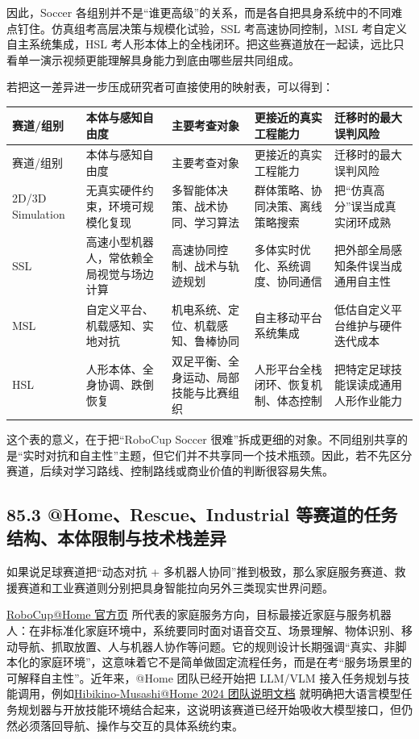 因此，Soccer 各组别并不是“谁更高级”的关系，而是各自把具身系统中的不同难点钉住。仿真组考高层决策与规模化试验，SSL 考高速协同控制，MSL 考自定义自主系统集成，HSL 考人形本体上的全栈闭环。把这些赛道放在一起读，远比只看单一演示视频更能理解具身能力到底由哪些层共同组成。

若把这一差异进一步压成研究者可直接使用的映射表，可以得到：

\begingroup
\small
\begin{xltabular}{\textwidth}{YYYYY}
\toprule
赛道/组别 & 本体与感知自由度 & 主要考查对象 & 更接近的真实工程能力 & 迁移时的最大误判风险 \\
\midrule
\endfirsthead
\toprule
赛道/组别 & 本体与感知自由度 & 主要考查对象 & 更接近的真实工程能力 & 迁移时的最大误判风险 \\
\midrule
\endhead
2D/3D Simulation & 无真实硬件约束，环境可规模化复现 & 多智能体决策、战术协同、学习算法 & 群体策略、协同决策、离线策略搜索 & 把“仿真高分”误当成真实闭环成熟 \\
SSL & 高速小型机器人，常依赖全局视觉与场边计算 & 高速协同控制、战术与轨迹规划 & 多体实时优化、系统调度、协同通信 & 把外部全局感知条件误当成通用自主性 \\
MSL & 自定义平台、机载感知、实地对抗 & 机电系统、定位、机载感知、鲁棒协同 & 自主移动平台系统集成 & 低估自定义平台维护与硬件迭代成本 \\
HSL & 人形本体、全身协调、跌倒恢复 & 双足平衡、全身运动、局部技能与比赛组织 & 人形平台全栈闭环、恢复机制、体态控制 & 把特定足球技能误读成通用人形作业能力 \\
\bottomrule
\end{xltabular}
\endgroup

这个表的意义，在于把“RoboCup Soccer 很难”拆成更细的对象。不同组别共享的是“实时对抗和自主性”主题，但它们并不共享同一个技术瓶颈。因此，若不先区分赛道，后续对学习路线、控制路线或商业价值的判断很容易失焦。

\subsection*{85.3 @Home、Rescue、Industrial 等赛道的任务结构、本体限制与技术栈差异}


如果说足球赛道把“动态对抗 + 多机器人协同”推到极致，那么家庭服务赛道、救援赛道和工业赛道则分别把具身智能拉向另外三类现实世界问题。

\href{https://athome.robocup.org/}{RoboCup@Home 官方页} 所代表的家庭服务方向，目标最接近家庭与服务机器人：在非标准化家庭环境中，系统要同时面对语音交互、场景理解、物体识别、移动导航、抓取放置、人与机器人协作等问题。它的规则设计长期强调“真实、非脚本化的家庭环境”，这意味着它不是简单做固定流程任务，而是在考“服务场景里的可解释自主性”。近年来，@Home 团队已经开始把 LLM/VLM 接入任务规划与技能调用，例如\href{https://arxiv.org/abs/2410.06192}{Hibikino-Musashi@Home 2024 团队说明文档} 就明确把大语言模型任务规划器与开放技能环境结合起来，这说明该赛道已经开始吸收大模型接口，但仍然必须落回导航、操作与交互的具体系统约束。

